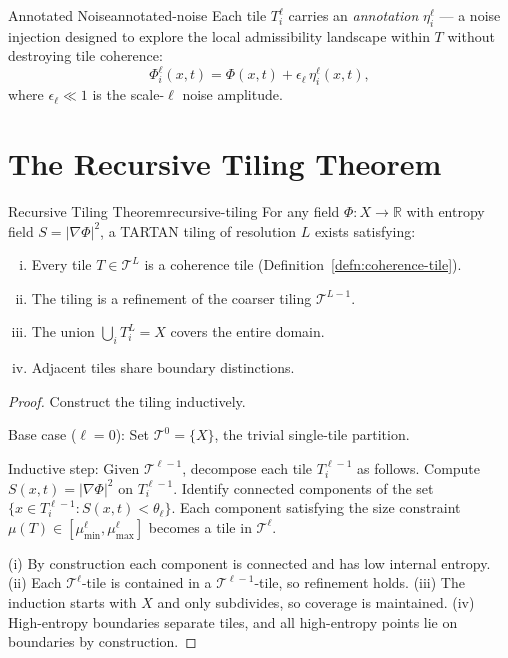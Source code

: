 \documentclass[12pt,twoside,openright]{book}
\begin{document}
\begin{definition}{Annotated Noise}{annotated-noise}
  Each tile $T^\ell_i$ carries an \emph{annotation}
  $\eta^\ell_i$ — a noise injection designed to
  explore the local admissibility landscape within $T$
  without destroying tile coherence:
  \[
    \Phi^\ell_i(x,t)
    = \Phi(x,t) + \epsilon_\ell \, \eta^\ell_i(x,t),
  \]
  where $\epsilon_\ell \ll 1$ is the scale-$\ell$
  noise amplitude.
\end{definition}

\section{The Recursive Tiling Theorem}

\begin{theorem}{Recursive Tiling Theorem}{recursive-tiling}
  For any field $\Phi: X \to \mathbb{R}$ with entropy
  field $S = |\nabla \Phi|^2$, a TARTAN tiling of
  resolution $L$ exists satisfying:
  \begin{enumerate}[(i)]
    \item Every tile $T \in \mathcal{T}^L$ is a coherence
          tile (Definition~\ref{defn:coherence-tile}).
    \item The tiling is a refinement of the coarser
          tiling $\mathcal{T}^{L-1}$.
    \item The union $\bigcup_i T^L_i = X$ covers the
          entire domain.
    \item Adjacent tiles share boundary distinctions.
  \end{enumerate}
\end{theorem}

\begin{proof}
  Construct the tiling inductively.

  Base case ($\ell = 0$): Set $\mathcal{T}^0 = \{X\}$,
  the trivial single-tile partition.

  Inductive step: Given $\mathcal{T}^{\ell-1}$, decompose
  each tile $T^{\ell-1}_i$ as follows.
  Compute $S(x,t) = |\nabla\Phi|^2$ on $T^{\ell-1}_i$.
  Identify connected components of the set
  $\{x \in T^{\ell-1}_i : S(x,t) < \theta_\ell\}$.
  Each component satisfying the size constraint
  $\mu(T) \in [\mu_{\min}^\ell, \mu_{\max}^\ell]$
  becomes a tile in $\mathcal{T}^\ell$.

  (i) By construction each component is connected and
  has low internal entropy.
  (ii) Each $\mathcal{T}^\ell$-tile is contained in a
  $\mathcal{T}^{\ell-1}$-tile, so refinement holds.
  (iii) The induction starts with $X$ and only subdivides,
  so coverage is maintained.
  (iv) High-entropy boundaries separate tiles, and all
  high-entropy points lie on boundaries by construction.
\end{proof}
\end{document}
